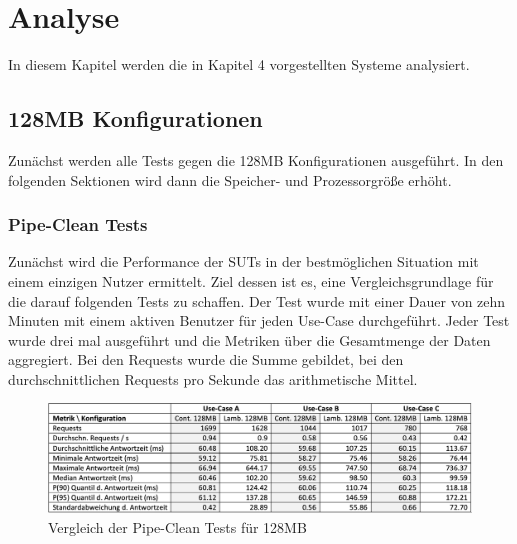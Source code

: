 \chapter{Analyse}
In diesem Kapitel werden die in Kapitel 4 vorgestellten Systeme analysiert.

\section{128MB Konfigurationen}
Zunächst werden alle Tests gegen die 128MB Konfigurationen ausgeführt. In den folgenden Sektionen wird dann die Speicher- und Prozessorgröße erhöht. 

\subsection{Pipe-Clean Tests}
Zunächst wird die Performance der SUTs in der bestmöglichen Situation mit einem einzigen Nutzer ermittelt. Ziel dessen ist es, eine Vergleichsgrundlage für die darauf folgenden Tests zu schaffen. Der Test wurde mit einer Dauer von zehn Minuten mit einem aktiven Benutzer für jeden Use-Case durchgeführt. Jeder Test wurde drei mal ausgeführt und die Metriken über die Gesamtmenge der Daten aggregiert. Bei den Requests wurde die Summe gebildet, bei den durchschnittlichen Requests pro Sekunde das arithmetische Mittel.

\begin{figure}[H]
    \includegraphics[width=\textwidth]{img/pipe128-comparison.png}
    \caption[Vergleich der Pipe-Clean Tests für 128MB]{Vergleich der Pipe-Clean Tests für 128MB}
    \label{fig:pipe128-comparison}
\end{figure}

